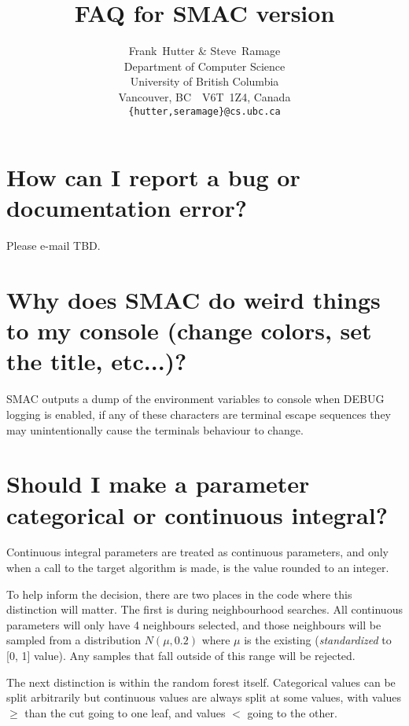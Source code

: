 \documentclass[11pt,letterpaper,oneside]{article}
\begin{document}
\title{FAQ for SMAC version }

\author{
Frank~Hutter \& Steve~Ramage\\
Department of Computer Science\\
University of British Columbia\\
Vancouver, BC\ \ V6T~1Z4, Canada\\
\texttt{\{hutter,seramage\}@cs.ubc.ca}
}



\maketitle

\renewcommand*\contentsname{FAQ}
\tableofcontents

\section{How can I report a bug or documentation error?}
 Please e-mail TBD.

\section{Why does SMAC do weird things to my console (change colors, set the title, etc...)?}

SMAC outputs a dump of the environment variables to console when DEBUG logging is enabled, if any of these characters are terminal escape sequences they may unintentionally cause the terminals behaviour to change.

\section{Should I make a parameter categorical or continuous integral?}

	Continuous integral parameters are treated as continuous parameters, and only when a call to the target algorithm is made, is the value rounded to an integer. 
	
	To help inform the decision, there are two places in the code where this distinction will matter. The first is during neighbourhood searches. All continuous parameters will only have 4 neighbours selected, and those neighbours will be sampled from a distribution $N(\mu, 0.2)$ where $\mu$ is the existing (\emph{standardized} to [0, 1] value). Any samples that fall outside of this range will be rejected.
	
	The next distinction is within the random forest itself. Categorical values can be split arbitrarily but continuous values are always split at some values, with values $\geq$ than the cut going to one leaf, and values $<$ going to the other.
	
\end{document}
